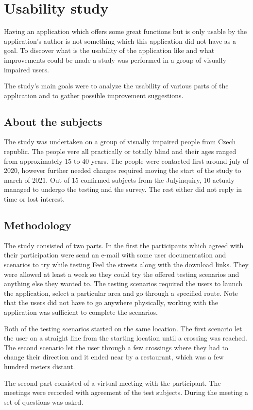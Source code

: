 \documentclass[nolof,digital]{fithesis3}
\begin{document}
\chapter{Usability study}
Having an application which offers some great functions but is only usable by the application's author is not something which this application did not have as a goal. To discover what is the usability of the application like and what improvements could be made a study was performed in a group of visually impaired users.

The study's main goals were to analyze the usability of various parts of the application and to gather possible improvement suggestions.
\section{About the subjects}
The study was undertaken on a group of visually impaired people from Czech republic. The people vere all practically or totally blind and their ages ranged from approximately 15 to 40 years. The people were contacted first around july of 2020, however further needed changes required moving the start of the study to march of 2021. Out of 15 confirmed subjects from the Julyinquiry, 10 actualy managed to undergo the testing and the survey. The rest either did not reply in time or lost interest.
\section{Methodology}
The study consisted of two parts. In the first the participants which agreed with their participation were send an e-mail with some user documentation and scenarios to try while testing Feel the streets along with the download links. They were allowed at least a week so they could try the offered testing scenarios and anything else they wanted to. The testing scenarios required the users to launch the application, select a particular area and go through a specified route. Note that the users did not have to go anywhere physically, working with the application was sufficient to complete the scenarios.

Both of the testing scenarios started on the same location. The first scenario let the user on a straight line from the starting location until a crossing was reached. The second scenario let the user through a few crossings where they had to change their direction and it ended near by a restaurant, which was a few hundred meters distant.

The second part consisted of a virtual meeting with the participant. The meetings were recorded with agreement of the test subjects. During the meeting a set of questions was asked.
\end{document}
